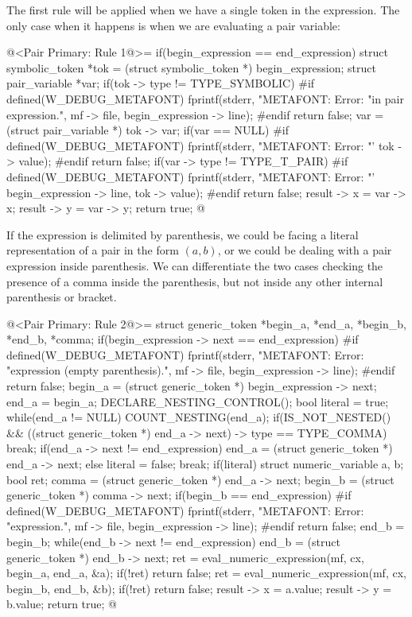 The first rule will be applied when we have a single token in the
expression. The only case when it happens is when we are evaluating a
pair variable:

\iniciocodigo
@<Pair Primary: Rule 1@>=
if(begin_expression == end_expression){
  struct symbolic_token *tok = (struct symbolic_token *) begin_expression;
  struct pair_variable *var;
  if(tok -> type != TYPE_SYMBOLIC){
#if defined(W_DEBUG_METAFONT)
    fprintf(stderr, "METAFONT: Error: %
            "in pair expression.",  mf -> file, begin_expression -> line);
#endif
    return false;
  }
  var = (struct pair_variable *) tok -> var;
  if(var == NULL){
#if defined(W_DEBUG_METAFONT)
    fprintf(stderr, "METAFONT: Error: %
            "'%
            tok -> value);
#endif
    return false;
  }
  if(var -> type != TYPE_T_PAIR){
#if defined(W_DEBUG_METAFONT)
    fprintf(stderr, "METAFONT: Error: %
            "'%
            begin_expression -> line, tok -> value);
#endif
    return false;
  }
  result -> x = var -> x;
  result -> y = var -> y;
  return true;
}
@
\fimcodigo

If the expression is delimited by parenthesis, we could be facing a
literal representation of a pair in the form $(a, b)$, or we could be
dealing with a pair expression inside parenthesis. We can
differentiate the two cases checking the presence of a comma inside
the parenthesis, but not inside any other internal parenthesis or
bracket.

\iniciocodigo
@<Pair Primary: Rule 2@>=
  struct generic_token *begin_a, *end_a, *begin_b, *end_b, *comma;
  if(begin_expression -> next == end_expression){
#if defined(W_DEBUG_METAFONT)
      fprintf(stderr, "METAFONT: Error: %
              "expression (empty parenthesis).\n ", mf -> file,
              begin_expression -> line);
#endif
    return false;
  }
  begin_a = (struct generic_token *) begin_expression -> next;
  end_a = begin_a;
  DECLARE_NESTING_CONTROL();
  bool literal = true;
  while(end_a != NULL){
    COUNT_NESTING(end_a);
    if(IS_NOT_NESTED() &&
       ((struct generic_token *) end_a -> next) -> type == TYPE_COMMA)
      break;
    if(end_a -> next != end_expression)
      end_a = (struct generic_token *) end_a -> next;
    else{
      literal = false;
      break;
    }
  }
  if(literal){
    struct numeric_variable a, b;
    bool ret;
    comma = (struct generic_token *) end_a -> next;
    begin_b = (struct generic_token *) comma -> next;
    if(begin_b == end_expression){
#if defined(W_DEBUG_METAFONT)
      fprintf(stderr, "METAFONT: Error: %
              "expression.\n ", mf -> file, begin_expression -> line);
#endif
      return false;
    }
    end_b = begin_b;
    while(end_b -> next != end_expression)
      end_b = (struct generic_token *) end_b -> next;
    ret = eval_numeric_expression(mf, cx, begin_a, end_a, &a);
    if(!ret)
      return false;
    ret = eval_numeric_expression(mf, cx, begin_b, end_b, &b);
    if(!ret)
      return false;
    result -> x = a.value;
    result -> y = b.value;
    return true;
  }
@
\fimcodigo

